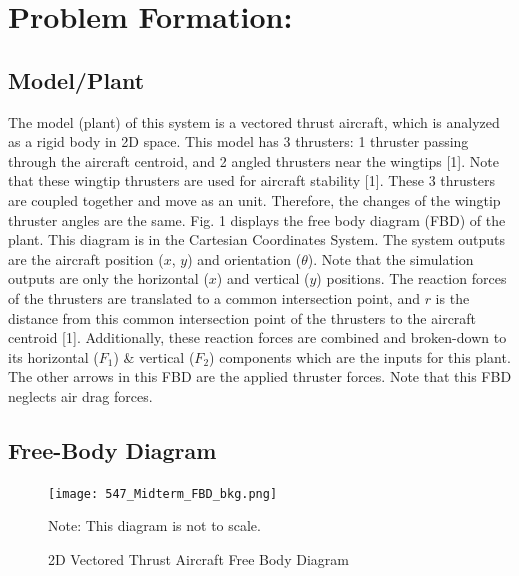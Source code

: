 \documentclass[conference]{IEEEtran}
\begin{document}
\section{Problem Formation:}
\subsection{Model/Plant}
The model (plant) of this system is a vectored thrust aircraft, which is analyzed as a rigid body in 2D space. This model has 3 thrusters: 1 thruster passing through the aircraft centroid, and 2 angled thrusters  near the wingtips [1]. Note that these wingtip thrusters are used for aircraft stability [1]. These 3 thrusters are coupled together and move as an unit. Therefore, the changes of the wingtip thruster angles are the same. Fig. 1 displays the free body diagram  (FBD) of the plant.  This diagram is in the Cartesian Coordinates System. The system outputs are the aircraft position ($x$, $y$) and orientation ($\theta$). Note that the simulation outputs are only the horizontal ($x$) and vertical ($y$) positions. The reaction forces of the thrusters are translated to a common intersection point, and $r$ is the distance from this common intersection point of the thrusters to the aircraft centroid [1]. Additionally, these reaction forces are combined and broken-down to its horizontal ($F_1$) \& vertical ($F_2$) components which are the inputs for this plant. The other arrows in this FBD are the applied thruster forces. Note that this FBD neglects air drag forces.

\subsection{Free-Body Diagram}
\begin{figure}[!htbp]
\centerline{\texttt{[image: 547\_Midterm\_FBD\_bkg.png]}}
\caption{2D Vectored Thrust Aircraft Free Body Diagram}
Note: This diagram is not to scale.
\label{figure1}
\end{figure}
\end{document}
